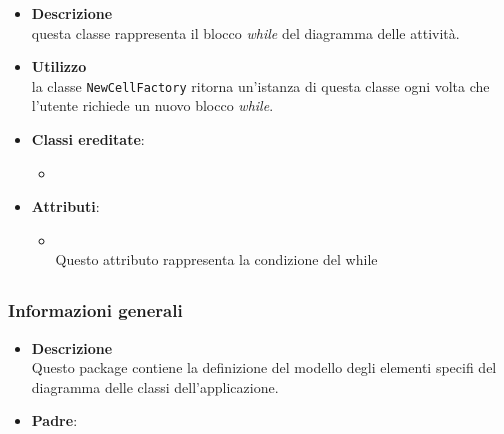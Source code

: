 \label{\nogloxy{swedesigner::client::model::celltypes::activity::HxWhile}}
\begin{itemize}
\item \textbf{Descrizione}\\
questa classe rappresenta il blocco \emph{while} del diagramma delle attività.
\item \textbf{Utilizzo}\\
la classe \texttt{NewCellFactory} ritorna un'istanza di questa classe ogni volta che l'utente richiede un nuovo blocco \emph{while}.
\item \textbf{Classi ereditate}:
\begin{itemize}
\item \hyperref[\nogloxy{swedesigner::client::model::celltypes::activity::ActivityDiagramElement}]{}
\end{itemize}
\item \textbf{Attributi}:
\begin{itemize}
\item {}
\\ Questo attributo rappresenta la condizione del while
\end{itemize}
\end{itemize}
\subsection{}
\label{\nogloxy{swedesigner::client::model::celltypes::class}}
\subsubsection{Informazioni generali}
\begin{itemize}
\item \textbf{Descrizione}\\
Questo package contiene la definizione del modello degli elementi specifi del diagramma delle classi dell'applicazione.
\item \textbf{Padre}: \hyperref[\nogloxy{swedesigner::client::model::celltypes}]{}
\end{itemize}

